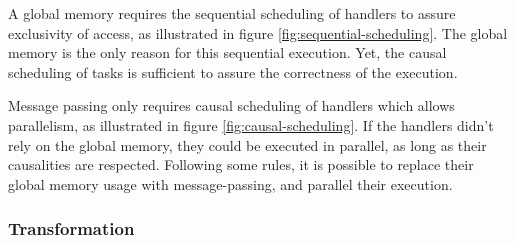 A global memory requires the sequential scheduling of handlers to assure exclusivity of access, as illustrated in figure \ref{fig:sequential-scheduling}. %
The global memory is the only reason for this sequential execution.
Yet, the causal scheduling of tasks is sufficient to assure the correctness of the execution.

Message passing only requires causal scheduling of handlers which allows parallelism, as illustrated  in figure \ref{fig:causal-scheduling}.
If the handlers didn't rely on the global memory, they could be executed in parallel, as long as their causalities are respected.
Following some rules, it is possible to replace their global memory usage with message-passing, and parallel their execution.

\subsubsection{Transformation}

